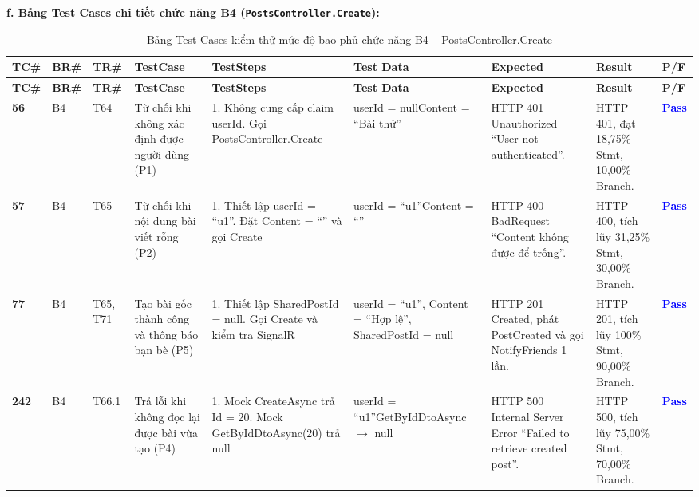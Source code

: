 \documentclass[11pt,a4paper]{article}
\begin{document}
\noindent\textbf{f. Bảng Test Cases chi tiết chức năng B4 (\texttt{PostsController.Create}):}
\begingroup
\scriptsize
\setlength{\tabcolsep}{3pt}
\begin{longtable}{|C{0.8cm}|C{0.75cm}|C{0.95cm}|L{2.0cm}|L{3.0cm}|L{2.25cm}|L{2.6cm}|L{2.5cm}|C{0.85cm}|}
\hline
{}
\textbf{TC\#} & \textbf{BR\#} & \textbf{TR\#} & \textbf{TestCase} & \textbf{TestSteps} & \textbf{Test Data} & \textbf{Expected} & \textbf{Result} & \textbf{P/F} \tabularnewline
\hline
\endfirsthead
\hline
{}
\textbf{TC\#} & \textbf{BR\#} & \textbf{TR\#} & \textbf{TestCase} & \textbf{TestSteps} & \textbf{Test Data} & \textbf{Expected} & \textbf{Result} & \textbf{P/F} \tabularnewline
\hline
\endhead
\hline
\endfoot
\hline
\caption{Bảng Test Cases kiểm thử mức độ bao phủ chức năng B4 -- PostsController.Create}
\endlastfoot
\textbf{56} & B4 & T64 & Từ chối khi không xác định được người dùng (P1) & 1. Không cung cấp claim userId. Gọi PostsController.\allowbreak Create & userId = null\newline Content = ``Bài thử'' & HTTP 401 Unauthorized ``User not authenticated''. & HTTP 401, đạt 18,75\% Stmt, 10,00\% Branch. & \textcolor{blue}{\textbf{Pass}} \\ \hline
\textbf{57} & B4 & T65 & Từ chối khi nội dung bài viết rỗng (P2) & 1. Thiết lập userId = ``u1''. Đặt Content = ``'' và gọi Create & userId = ``u1''\newline Content = ``'' & HTTP 400 BadRequest ``Content không được để trống''. & HTTP 400, tích lũy 31,25\% Stmt, 30,00\% Branch. & \textcolor{blue}{\textbf{Pass}} \\ \hline
\textbf{77} & B4 & T65, T71 & Tạo bài gốc thành công và thông báo bạn bè (P5) & 1. Thiết lập SharedPostId = null. Gọi Create và kiểm tra SignalR & userId = ``u1'', Content = ``Hợp lệ'', SharedPostId = null & HTTP 201 Created, phát PostCreated và gọi NotifyFriends 1 lần. & HTTP 201, tích lũy 100\% Stmt, 90,00\% Branch. & \textcolor{blue}{\textbf{Pass}} \\ \hline
\textbf{242} & B4 & T66.1 & Trả lỗi khi không đọc lại được bài vừa tạo (P4) & 1. Mock CreateAsync trả Id = 20. Mock GetByIdDto\allowbreak Async(20) trả null & userId = ``u1''\newline GetByIdDto\allowbreak Async $\rightarrow$ null & HTTP 500 Internal Server Error ``Failed to retrieve created post''. & HTTP 500, tích lũy 75,00\% Stmt, 70,00\% Branch. & \textcolor{blue}{\textbf{Pass}} \\ \hline

\end{longtable}
\end{document}
